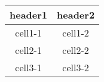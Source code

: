 \label{\detokenize{tabular:table-with-tabularcolumn}}

\begin{savenotes}\sphinxattablestart
\centering
\begin{tabulary}{\linewidth}[t]{|c|c|}
\hline
\sphinxstyletheadfamily 
header1
&\sphinxstyletheadfamily 
header2
\\
\hline
cell1-1
&
cell1-2
\\
\hline
cell2-1
&
cell2-2
\\
\hline
cell3-1
&
cell3-2
\\
\hline
\end{tabulary}
\par
\sphinxattableend\end{savenotes}
